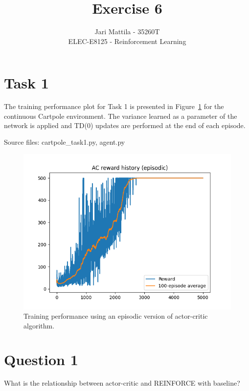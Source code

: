 \documentclass[12pt]{article}
\begin{document}
 
\title{Exercise 6}
\author{Jari Mattila - 35260T\\
ELEC-E8125 - Reinforcement Learning}

\maketitle

\section*{Task 1}

The training performance plot for Task 1 is presented in Figure~\ref*{fig:fig1} for the continuous Cartpole environment. 
The variance learned as a parameter of the network is applied and TD(0) updates are performed at the end of each episode.
\newline

\noindent
Source files: cartpole\_task1.py, agent.py

\begin{figure}[phb] 
	\centering  %
    \includegraphics[width=0.9\columnwidth]{img/Figure_1_task_1_cumulative_reward.png}
	\caption{Training performance using an episodic version of actor-critic algorithm.}
	\label{fig:fig1}
\end{figure}

\pagebreak


\section*{Question 1}

What is the relationship between actor-critic and REINFORCE with baseline?
\newline
\end{document}
